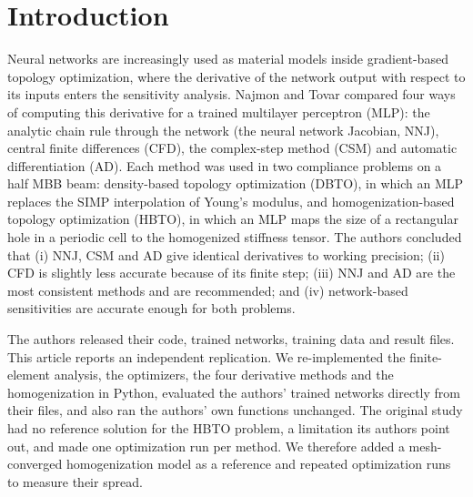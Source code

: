 \newcommand{\sci}[2]{\ensuremath{#1\times10^{#2}}}
\newcommand{\todo}[1]{\textcolor{darkred}{[\textbf{To do:} #1]}}
\newcommand{\code}[1]{\texttt{#1}}

\section{Introduction}

Neural networks are increasingly used as material models inside gradient-based
topology optimization, where the derivative of the network output with respect
to its inputs enters the sensitivity analysis. Najmon and
Tovar\supercite{Najmon:2024} compared four ways of computing this derivative
for a trained multilayer perceptron (MLP): the analytic chain rule through the
network (the neural network Jacobian, NNJ), central finite differences (CFD),
the complex-step method (CSM)\supercite{Squire:1998,Martins:2003} and automatic
differentiation (AD)\supercite{Baydin:2018}. Each method was used in two
compliance problems on a half MBB beam: density-based topology optimization
(DBTO), in which an MLP replaces the SIMP interpolation of Young's
modulus\supercite{Bendsoe:1989}, and homogenization-based topology optimization
(HBTO)\supercite{Bendsoe:1988}, in which an MLP maps the size of a rectangular
hole in a periodic cell to the homogenized stiffness tensor. The authors
concluded that (i) NNJ, CSM and AD give identical derivatives to working
precision; (ii) CFD is slightly less accurate because of its finite step;
(iii) NNJ and AD are the most consistent methods and are recommended; and
(iv) network-based sensitivities are accurate enough for both problems.

The authors released their code, trained networks, training data and result
files\supercite{NajmonCode}. This article reports an independent replication.
We re-implemented the finite-element analysis, the optimizers, the four
derivative methods and the homogenization in Python, evaluated the authors'
trained networks directly from their files, and also ran the authors' own
functions unchanged. The original study had no reference solution for the HBTO
problem, a limitation its authors point out, and made one optimization run per
method. We therefore added a mesh-converged homogenization model as a reference
and repeated optimization runs to measure their spread.

